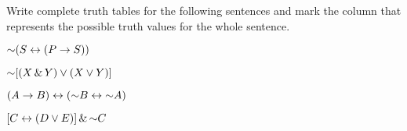 \noindent\problempart Write complete truth tables for the following sentences and mark the column that represents the possible truth values for the whole sentence.

\begin{earg}

\item $\mathord{\sim} (S \leftrightarrow (P \rightarrow S))$



 \item $\mathord{\sim} [(X \,\&\, Y) \vee (X \vee Y)]$



\item $(A \rightarrow B) \leftrightarrow (\mathord{\sim} B\leftrightarrow \mathord{\sim} A)$

\item $[C \leftrightarrow (D \vee E)] \,\&\, \mathord{\sim} C$


\end{earg}
